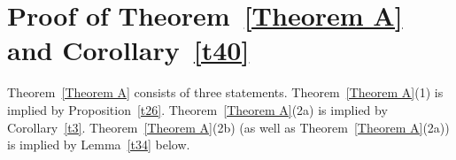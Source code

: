 
























































\section{Proof of Theorem~\ref{Theorem A} and Corollary~\ref{t40}} \label{sec.proofs}
Theorem~\ref{Theorem A} consists of three statements. 
Theorem~\ref{Theorem A}(1) is implied by Proposition~\ref{t26}.
Theorem~\ref{Theorem A}(2a) is implied by Corollary~\ref{t3}.
Theorem~\ref{Theorem A}(2b) (as well as Theorem~\ref{Theorem A}(2a)) is implied by Lemma~\ref{t34} below.









